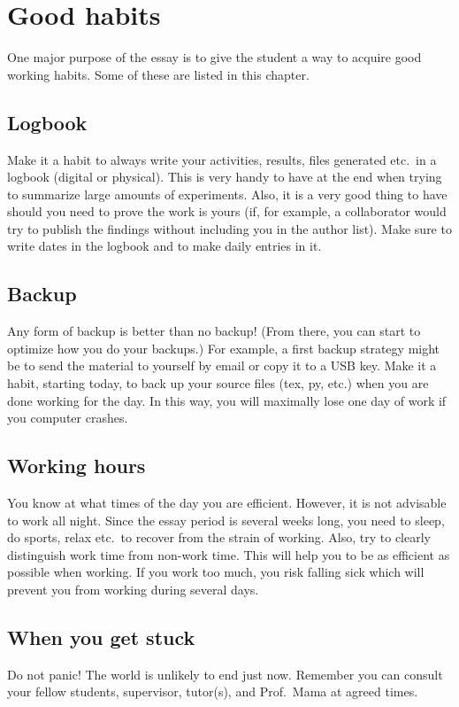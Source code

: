 \chapter{Good habits}
One major purpose of the essay is to give the student a way to acquire good working habits. Some of these are listed in this chapter.

\section{Logbook}
Make it a habit to always write your activities, results, files generated etc.\ in a logbook (digital or physical). This is very handy to have at the end when trying to summarize large amounts of experiments. Also, it is a very good thing to have should you need to prove the work is yours (if, for example, a collaborator would try to publish the findings without including you in the author list). Make sure to write dates in the logbook and to make daily entries in it. \cite{karplus1990molecular}

\section{Backup}
Any form of backup is better than no backup! (From there, you can start to optimize how you do your backups.) For example, a first backup strategy might be to send the material to yourself by email or copy it to a USB key. Make it a habit, starting today, to back up your source files (tex, py, etc.) when you are done working for the day. In this way, you will maximally lose one day of work if you computer crashes.

\section{Working hours}
You know at what times of the day you are efficient. However, it is not advisable to work all night. Since the essay period is several weeks long, you need to sleep, do sports, relax etc.\ to recover from the strain of working. Also, try to clearly distinguish work time from non-work time. This will help you to be as efficient as possible when working. If you work too much, you risk falling sick which will prevent you from working during several days.

\section{When you get stuck}
Do not panic! The world is unlikely to end just now. Remember you can consult your fellow students, supervisor, tutor(s), and Prof.\ Mama at agreed times.

